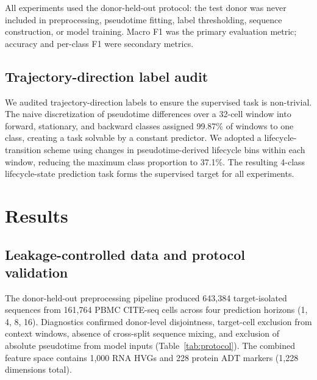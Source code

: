 \documentclass[11pt,twocolumn]{article}
\begin{document}
All experiments used the donor-held-out protocol: the test donor was never included in preprocessing, pseudotime fitting, label thresholding, sequence construction, or model training. Macro F1 was the primary evaluation metric; accuracy and per-class F1 were secondary metrics.

\subsection{Trajectory-direction label audit}

We audited trajectory-direction labels to ensure the supervised task is non-trivial. The naive discretization of pseudotime differences over a 32-cell window into forward, stationary, and backward classes assigned 99.87\% of windows to one class, creating a task solvable by a constant predictor. We adopted a lifecycle-transition scheme using changes in pseudotime-derived lifecycle bins within each window, reducing the maximum class proportion to 37.1\%. The resulting 4-class lifecycle-state prediction task forms the supervised target for all experiments.

\section{Results}

\subsection{Leakage-controlled data and protocol validation}

The donor-held-out preprocessing pipeline produced 643,384 target-isolated sequences from 161,764 PBMC CITE-seq cells across four prediction horizons (1, 4, 8, 16). Diagnostics confirmed donor-level disjointness, target-cell exclusion from context windows, absence of cross-split sequence mixing, and exclusion of absolute pseudotime from model inputs (Table~\ref{tab:protocol}). The combined feature space contains 1,000 RNA HVGs and 228 protein ADT markers (1,228 dimensions total).
\end{document}
